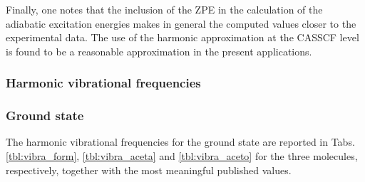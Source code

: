 %
%
%
%


Finally, one notes that the inclusion of the ZPE in the calculation of the
adiabatic excitation energies makes in general the computed values closer to
the experimental data. The use of the harmonic approximation at the CASSCF
level is found to be a reasonable approximation in the present applications.

\subsubsection*{Harmonic vibrational frequencies}

\subsubsection*{Ground state}
The harmonic vibrational frequencies for the ground state are 
reported in Tabs. \ref{tbl:vibra_form}, \ref{tbl:vibra_aceta} and 
\ref{tbl:vibra_aceto} for the three molecules, respectively, together
with the most meaningful published values.

